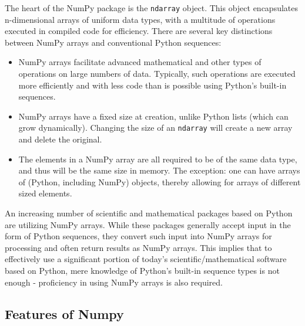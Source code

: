 The heart of the NumPy package is the \texttt{ndarray} object. This object encapsulates n-dimensional arrays of uniform data types, with a multitude of operations executed in compiled code for efficiency. There are several key distinctions between NumPy arrays and conventional Python sequences:

\begin{itemize}
	\item NumPy arrays facilitate advanced mathematical and other types of operations on large numbers of data. Typically, such operations are executed more efficiently and with less code than is possible using Python’s built-in sequences.
	\item NumPy arrays have a fixed size at creation, unlike Python lists (which can grow dynamically). Changing the size of an \texttt{ndarray} will create a new array and delete the original.
	\item The elements in a NumPy array are all required to be of the same data type, and thus will be the same size in memory. The exception: one can have arrays of (Python, including NumPy) objects, thereby allowing for arrays of different sized elements.
\end{itemize}

An increasing number of scientific and mathematical packages based on Python are utilizing NumPy arrays. While these packages generally accept input in the form of Python sequences, they convert such input into NumPy arrays for processing and often return results as NumPy arrays. This implies that to effectively use a significant portion of today's scientific/mathematical software based on Python, mere knowledge of Python's built-in sequence types is not enough - proficiency in using NumPy arrays is also required.

\subsection{Features of Numpy}

